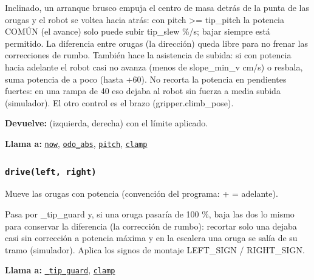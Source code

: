Inclinado, un arranque brusco empuja el centro de masa detrás de la punta de las orugas y el robot se voltea hacia atrás: con pitch >= tip\_pitch la potencia COMÚN (el avance) solo puede subir tip\_slew \%/s; bajar siempre está permitido. La diferencia entre orugas (la dirección) queda libre para no frenar las correcciones de rumbo. También hace la asistencia de subida: si con potencia hacia adelante el robot casi no avanza (menos de slope\_min\_v cm/s) o resbala, suma potencia de a poco (hasta +60). No recorta la potencia en pendientes fuertes: en una rampa de 40\textdegree{} eso dejaba al robot sin fuerza a media subida (simulador). El otro control es el brazo (gripper.climb\_pose).

\par{}\par\smallskip
\noindent\textbf{Devuelve:} (izquierda, derecha) con el límite aplicado.\par
\noindent\textbf{Llama a:} \hyperref[fn:hal:now]{\texttt{now}}, \hyperref[fn:hal:odo-abs]{\texttt{odo\_\allowbreak{}abs}}, \hyperref[fn:hal:pitch]{\texttt{pitch}}, \hyperref[fn:hal:clamp]{\texttt{clamp}}\par

\subsubsection{\texttt{drive(left, right)}}\label{fn:hal:drive}
\noindent Mueve las orugas con potencia (convención del programa: + = adelante).

Pasa por \_tip\_guard y, si una oruga pasaría de 100 \%, baja las dos lo mismo para conservar la diferencia (la corrección de rumbo): recortar solo una dejaba casi sin corrección a potencia máxima y en la escalera una oruga se salía de su tramo (simulador). Aplica los signos de montaje LEFT\_SIGN / RIGHT\_SIGN.

\par{}\par\smallskip
\noindent\textbf{Llama a:} \hyperref[fn:hal:-tip-guard]{\texttt{\_\allowbreak{}tip\_\allowbreak{}guard}}, \hyperref[fn:hal:clamp]{\texttt{clamp}}\par

